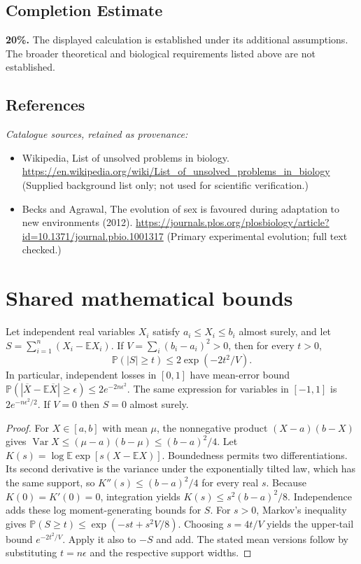 \documentclass[11pt]{article}
\begin{document}
\subsection{Completion Estimate}
\textbf{20\%.} The displayed calculation is established under its additional assumptions. The broader theoretical and biological requirements listed above are not established.
\subsection{References}
\noindent\emph{Catalogue sources, retained as provenance:}
\begin{itemize}
\item Wikipedia, List of unsolved problems in biology. \url{https://en.wikipedia.org/wiki/List_of_unsolved_problems_in_biology} (Supplied background list only; not used for scientific verification.)
\item Becks and Agrawal, The evolution of sex is favoured during adaptation to new environments (2012). \url{https://journals.plos.org/plosbiology/article?id=10.1371/journal.pbio.1001317} (Primary experimental evolution; full text checked.)
\end{itemize}




\section{Shared mathematical bounds}\label{app:bounds}
\begin{lemma}\label{lem:bounded}
Let independent real variables $X_i$ satisfy $a_i\leq X_i\leq b_i$ almost surely,
and let $S=\sum_{i=1}^n(X_i-\mathbb{E} X_i)$. If
$V=\sum_i(b_i-a_i)^2>0$, then for every $t>0$,
\[
 \mathbb{P}(|S|\geq t)\leq 2\exp(-2t^2/V).
\]
In particular, independent losses in $[0,1]$ have mean-error bound
$\mathbb{P}(|\overline X-\mathbb{E}\overline X|\geq\epsilon)
\leq2e^{-2n\epsilon^2}$. The same expression for variables in $[-1,1]$
is $2e^{-n\epsilon^2/2}$. If $V=0$ then $S=0$ almost surely.
\end{lemma}
\begin{proof}
For $X\in[a,b]$ with mean $\mu$, the nonnegative product
$(X-a)(b-X)$ gives
$\operatorname{Var} X\leq(\mu-a)(b-\mu)\leq(b-a)^2/4$.
Let $K(s)=\log\mathbb{E}\exp[s(X-\mathbb{E} X)]$.
Boundedness permits two differentiations. Its second derivative is the variance
under the exponentially tilted law, which has the same support, so
$K''(s)\leq(b-a)^2/4$ for every real $s$.
Because $K(0)=K'(0)=0$, integration yields
$K(s)\leq s^2(b-a)^2/8$.
Independence adds these log moment-generating bounds for $S$.
For $s>0$, Markov's inequality gives
$\mathbb{P}(S\geq t)\leq\exp(-st+s^2V/8)$.
Choosing $s=4t/V$ yields the upper-tail bound $e^{-2t^2/V}$.
Apply it also to $-S$ and add. The stated mean versions follow by substituting
$t=n\epsilon$ and the respective support widths.
\end{proof}
\end{document}
